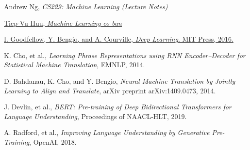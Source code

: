 \begin{thebibliography}{99}

    Andrew Ng, \textit{CS229: Machine Learning (Lecture Notes)}

    \href{https://machinelearningcoban.com/}{Tiep-Vu Huu, \textit{Machine Learning co ban}}

    \href{http://www.deeplearningbook.org/}{I. Goodfellow, Y. Bengio, and A. Courville, \textit{Deep Learning}. MIT Press, 2016.}

    K. Cho, et al., \textit{Learning Phrase Representations using RNN Encoder–Decoder for Statistical Machine Translation}, EMNLP, 2014.

    D. Bahdanau, K. Cho, and Y. Bengio, \textit{Neural Machine Translation by Jointly Learning to Align and Translate}, arXiv preprint arXiv:1409.0473, 2014.
    
    J. Devlin, et al., \textit{BERT: Pre-training of Deep Bidirectional Transformers for Language Understanding}, Proceedings of NAACL-HLT, 2019.
    
    A. Radford, et al., \textit{Improving Language Understanding by Generative Pre-Training}, OpenAI, 2018.
    
\end{thebibliography}